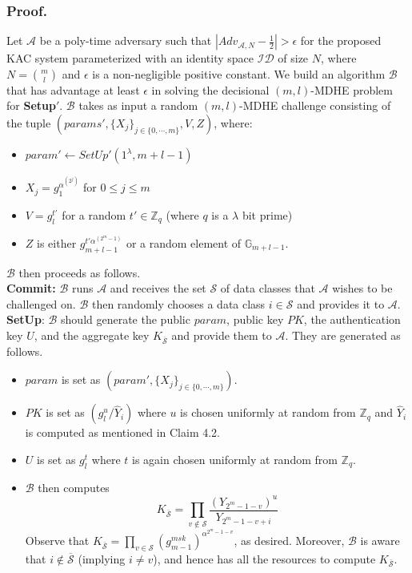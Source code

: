 \subsubsection{Proof.} Let $\mathcal{A}$ be a poly-time adversary such that $|Adv_{\mathcal{A},N}-\frac{1}{2}| > \epsilon$ for the proposed KAC system parameterized with an identity space $\mathcal{ID}$ of size $N$, where $N=\binom{m}{l}$ and $\epsilon$ is a non-negligible positive constant. We build an algorithm $\mathcal{B}$ that has advantage at least $\epsilon$ in solving the decisional $(m,l)$-MDHE problem for \textbf{Setup}$'$. $\mathcal{B}$ takes as input a random $(m,l)$-MDHE challenge consisting of the tuple $(params',\{X_j\}_{j\in\{0,\cdots,m\}},V,Z)$, where:
\begin{itemize}
 \item $param'\leftarrow SetUp'(1^{\lambda},m+l-1)$
 \item $X_j=g^{\alpha^{(2^j)}}_{1}$ for $0\leq j \leq m$
 \item $V=g^{t'}_{l}$ for a random $t'\in\mathbb{Z}_q$ (where $q$ is a $\lambda$ bit prime)
 \item $Z$ is either $g^{t'\alpha^{(2^m-1)}}_{m+l-1}$ or a random element of $\mathbb{G}_{m+l-1}$.
\end{itemize}
\noindent $\mathcal{B}$ then proceeds as follows.\\

\noindent \textbf{Commit:} $\mathcal{B}$ runs $\mathcal{A}$ and receives the set $\mathcal{S}$ of data classes that $\mathcal{A}$ wishes to be challenged on. $\mathcal{B}$ then randomly chooses a data class $i\in\mathcal{S}$ and provides it to $\mathcal{A}$.\\
 
\noindent \textbf{SetUp}: $\mathcal{B}$ should generate the public $param$, public key $PK$, the authentication key $U$, and the aggregate key $K_{\overline{\mathcal{S}}}$ and provide them to $\mathcal{A}$. They are generated as follows.
\begin{itemize}
  \item $param$ is set as $(param',\{X_j\}_{j\in\{0,\cdots,m\}})$.
  \item $PK$ is set as $({g^u_{l}}/{\hat{Y}_i})$ where $u$ is chosen uniformly at random from $\mathbb{Z}_q$ and $\hat{Y}_i$ is computed as mentioned in Claim 4.2. 
  \item $U$ is set as $g^{t}_{l}$ where $t$ is again chosen uniformly at random from $\mathbb{Z}_q$.
  \item $\mathcal{B}$ then computes   
  \begin{equation}
   K_{\overline{\mathcal{S}}} = \prod_{v\notin\mathcal{S}}\frac{\left(Y_{2^m-1-v}\right)^u}{Y_{2^m-1-v+i}}\nonumber
  \end{equation}
  \noindent Observe that $K_{\overline{\mathcal{S}}}=\prod_{v\in\mathcal{S}}{\left(g^{msk}_{m-1}\right)}^{\alpha^{2^m-1-v}}$, as desired. Moreover, $\mathcal{B}$ is aware that $i\notin \overline{\mathcal{S}}$ (implying $i\neq v$), and hence has all the resources to compute $K_{\overline{\mathcal{S}}}$.  
\end{itemize}
 
